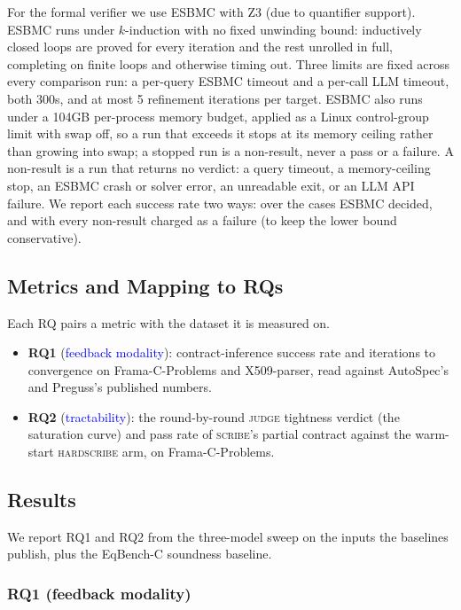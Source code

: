 \documentclass[conference]{IEEEtran}
\theoremstyle{definition}
\theoremstyle{remark}
\begin{document}
For the formal verifier we use ESBMC
with Z3 (due to quantifier support). ESBMC runs under
$k$-induction with no fixed unwinding bound: inductively closed loops
are proved for every iteration and the rest unrolled in full,
completing on finite loops and otherwise timing out. Three limits are
fixed across every comparison run: a per-query ESBMC timeout and a
per-call LLM timeout, both 300s, and at most 5 refinement iterations
per target. ESBMC also runs under a 104GB per-process memory budget,
applied as a Linux control-group limit with swap off, so a run that
exceeds it stops at its memory ceiling rather than growing into swap;
a stopped run is a non-result, never a pass or a failure. A
non-result is a run that returns no verdict: a query timeout, a
memory-ceiling stop, an ESBMC crash or solver error, an unreadable
exit, or an LLM API failure. We report each success rate two ways:
over the cases ESBMC decided, and with every non-result charged as a
failure (to keep the lower bound conservative).

\subsection{Metrics and Mapping to RQs}

Each RQ pairs a metric with the dataset it is measured on.
\begin{itemize}
  \item \textbf{RQ1} (\textcolor{blue}{feedback modality}):
    contract-inference success rate and iterations to convergence on
    Frama-C-Problems and X509-parser, read against AutoSpec's and
    Preguss's published numbers.
  \item \textbf{RQ2} (\textcolor{blue}{tractability}): the round-by-round
    \textsc{judge} tightness verdict (the saturation curve) and pass rate
    of \textsc{scribe}'s partial contract against the warm-start
    \textsc{hardscribe} arm, on Frama-C-Problems.
\end{itemize}

\subsection{Results}

We report RQ1 and RQ2 from the three-model sweep on the inputs the
baselines publish, plus the EqBench-C soundness baseline.

\subsubsection{RQ1 (feedback modality)}
\end{document}
